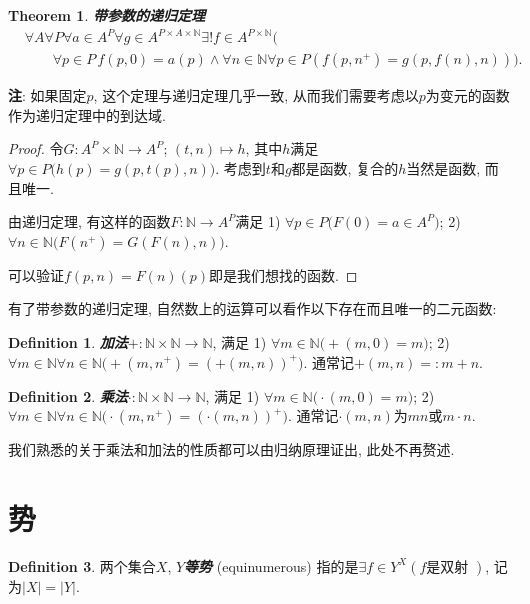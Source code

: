 \documentclass[openany]{ctexbook}
\newcommand*{\indexbf}[1]{\emph{\textbf{#1}}\index{#1}} %
\theoremstyle{plain}
\newtheorem{theorem}{Theorem}[section] %
\theoremstyle{definition}
\newtheorem{definition}{Definition}[section] %
\begin{document}
\begin{theorem} \indexbf{带参数的递归定理}
\begin{align*}
&
	\forall A\forall P\forall a\in A^P
	\forall g \in A^{P\times A\times \mathbb N}
	\exists ! f\in A^{P\times \mathbb N}\big(
\\ &\qquad
		\forall p\in P\,f(p,0)=a(p) \wedge \forall n\in \mathbb N\forall p\in P(
			f(p,n^+) = g(p,f(n),n))\big).
\end{align*}

\end{theorem}
\textbf{注}: 如果固定$p$, 这个定理与递归定理几乎一致, 从而我们需要考虑以$p$为变元的函数作为递归定理中的到达域.
\begin{proof}
令$G\colon A^P\times \mathbb N \to A^P$; $(t,n) \mapsto h$, 其中$h$满足$\forall p\in P \big(
	h(p) = g(p,t(p),n)\big)$. 
考虑到$t$和$g$都是函数, 复合的$h$当然是函数, 而且唯一.

由递归定理, 有这样的函数$F \colon \mathbb N \to A^P$满足 
1) $\forall p\in P\big(
	F(0)=a\in A^P\big)$; 
2) $\forall n\in \mathbb N\big(
	F(n^+) = G(F(n), n)\big)$. 

可以验证$f(p,n) = F(n)(p)$即是我们想找的函数.
\end{proof}

有了带参数的递归定理, 自然数上的运算可以看作以下存在而且唯一的二元函数:

\begin{definition}
\indexbf{加法}$+\colon \mathbb N\times \mathbb N \to \mathbb N$, 满足
1) $\forall m\in \mathbb N \big( 
	+(m,0)=m\big)$;
2) $\forall m\in\mathbb N\forall n\in \mathbb N \big(
	+(m,n^+)=(+(m,n))^+\big)$. 通常记$+(m,n) =: m+n$.
\end{definition}

\begin{definition}
\indexbf{乘法}$\cdot \colon \mathbb N\times \mathbb N \to \mathbb N$, 满足
1) $\forall m\in \mathbb N \big( 
	\cdot(m,0)=m\big)$;
2) $\forall m\in\mathbb N\forall n\in \mathbb N \big(
	\cdot(m,n^+)=(\cdot(m,n))^+\big)$. 通常记$\cdot(m,n) $为$mn$或$m\cdot n$.
\end{definition}

我们熟悉的关于乘法和加法的性质都可以由归纳原理证出, 此处不再赘述.

\section{势}

\begin{definition}\label{equinumerosity}
两个集合$X$, $Y$\indexbf{等势} (equinumerous) 指的是$\exists f \in Y^X (f\text{是双射 })$, 记为$|X|=|Y|$.
\end{definition}
\end{document}
